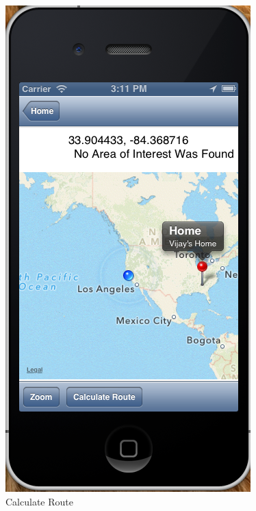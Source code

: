 \documentclass[10pt]{sigplan-proc-varsize}
\begin{document}
\begin{figure}[h!]
  \caption{Calculate Route}
  \centering
    \includegraphics[scale=0.4]{CalcRoute}
\end{figure}
\end{document}
